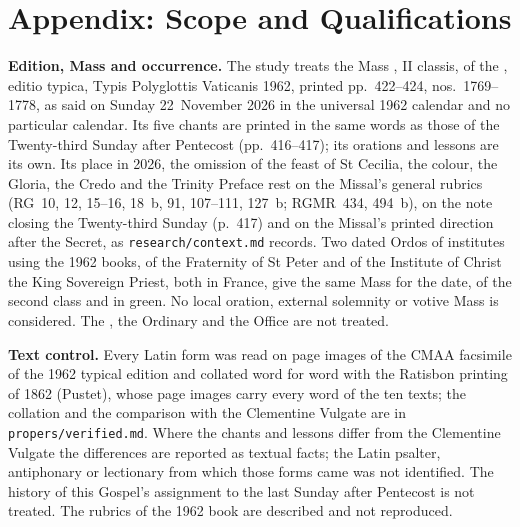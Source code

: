 \section{Appendix: Scope and Qualifications}
\label{sec:scope}

{\small
\textbf{Edition, Mass and occurrence.} The study treats the Mass
, II classis, of
the , editio typica, Typis Polyglottis Vaticanis 1962,
printed pp.~422--424, nos.~1769--1778, as said on Sunday 22~November 2026 in
the universal 1962 calendar and no particular calendar. Its five chants are
printed in the same words as those of the Twenty-third Sunday after Pentecost
(pp.~416--417); its orations and lessons are its own. Its place in 2026, the
omission of the feast of St Cecilia, the colour, the Gloria, the Credo and the
Trinity Preface rest on the Missal's general rubrics (RG~10, 12, 15--16, 18~b,
91, 107--111, 127~b; RGMR~434, 494~b), on the note closing the Twenty-third
Sunday (p.~417) and on the Missal's printed direction after the Secret, as
\texttt{research/context.md} records. Two dated Ordos of institutes using the
1962 books, of the Fraternity of St Peter and of the Institute of Christ the
King Sovereign Priest, both in France, give the same Mass for the date, of the
second class and in green. No local oration, external solemnity or votive Mass
is considered. The , the Ordinary and the Office are not
treated.

\textbf{Text control.} Every Latin form was read on page images of the CMAA
facsimile of the 1962 typical edition and collated word for word with the
Ratisbon printing of 1862 (Pustet), whose page images carry every word of the
ten texts; the collation and the comparison with the Clementine Vulgate are in
\texttt{propers/verified.md}. Where the chants and lessons differ from the
Clementine Vulgate the differences are reported as textual facts; the Latin
psalter, antiphonary or lectionary from which those forms came was not
identified. The history of this Gospel's assignment to the last Sunday after
Pentecost is not treated. The rubrics of the 1962 book are described and not
reproduced.

}
